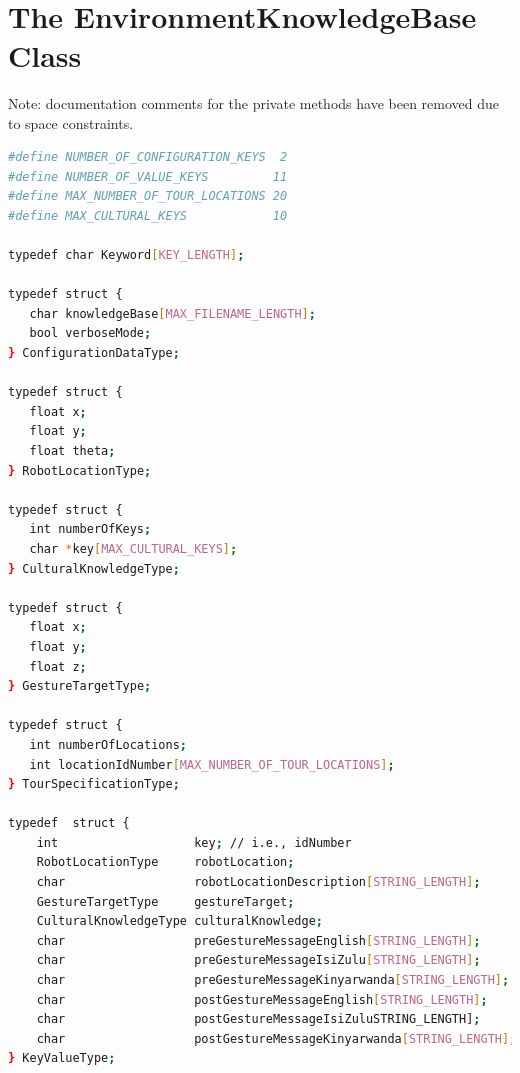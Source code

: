 \documentclass{CSSRforAfrica}
\begin{document}
\newpage
\begin{appendices}
~
\vspace{-15mm}
\section{The EnvironmentKnowledgeBase Class}
\label{appendix:helper_class}  
\vspace{-2mm}
Note: documentation comments for the private methods have been removed due to space constraints.

\begin{lstlisting}[style=withoutNumbering, language=bash]
#define NUMBER_OF_CONFIGURATION_KEYS  2
#define NUMBER_OF_VALUE_KEYS         11
#define MAX_NUMBER_OF_TOUR_LOCATIONS 20
#define MAX_CULTURAL_KEYS            10

typedef char Keyword[KEY_LENGTH];

typedef struct {
   char knowledgeBase[MAX_FILENAME_LENGTH];
   bool verboseMode;
} ConfigurationDataType;

typedef struct {
   float x;
   float y;
   float theta;
} RobotLocationType;

typedef struct {
   int numberOfKeys;
   char *key[MAX_CULTURAL_KEYS];
} CulturalKnowledgeType;

typedef struct {
   float x;
   float y;
   float z;
} GestureTargetType;

typedef struct {
   int numberOfLocations;
   int locationIdNumber[MAX_NUMBER_OF_TOUR_LOCATIONS];
} TourSpecificationType;

typedef  struct {
    int                   key; // i.e., idNumber
    RobotLocationType     robotLocation;
    char                  robotLocationDescription[STRING_LENGTH];
    GestureTargetType     gestureTarget;
    CulturalKnowledgeType culturalKnowledge;
    char                  preGestureMessageEnglish[STRING_LENGTH];
    char                  preGestureMessageIsiZulu[STRING_LENGTH];
    char                  preGestureMessageKinyarwanda[STRING_LENGTH];
    char                  postGestureMessageEnglish[STRING_LENGTH];
    char                  postGestureMessageIsiZuluSTRING_LENGTH];
    char                  postGestureMessageKinyarwanda[STRING_LENGTH];
} KeyValueType;


\end{lstlisting}
\end{appendices}
\end{document}
